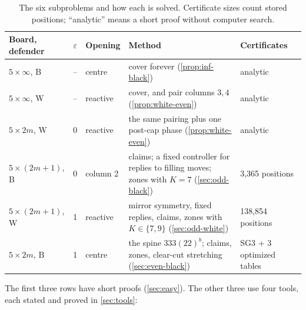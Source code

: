\documentclass[11pt,a4paper]{article}
\theoremstyle{plain}
\theoremstyle{definition}
\newcommand{\B}{\mathrm{B}}
\newcommand{\W}{\mathrm{W}}
\newcommand{\eps}{\varepsilon}
\begin{document}
\begin{table}[!htbp]
\centering
\caption{The six subproblems and how each is solved. Certificate sizes count stored positions; ``analytic'' means a short proof without computer search.}
\label{tab:overview}
\footnotesize
\begin{tabularx}{\linewidth}{@{}l c l Y l@{}}
\toprule
\textbf{Board, defender} & $\eps$ & \textbf{Opening} & \textbf{Method} & \textbf{Certificates} \\
\midrule
$5\times\infty$, $\B$ & -- & centre & cover forever (\cref{prop:inf-black}) & analytic \\
$5\times\infty$, $\W$ & -- & reactive & cover, and pair columns $3,4$ (\cref{prop:white-even}) & analytic \\
\midrule
$5\times 2m$, $\W$ & 0 & reactive & the same pairing plus one post-cap phase (\cref{prop:white-even}) & analytic \\
$5\times(2m{+}1)$, $\B$ & 0 & column 2 & claims; a fixed controller for replies to filling moves; zones with $K=7$ (\cref{sec:odd-black}) & 3{,}365 positions \\
\midrule
$5\times(2m{+}1)$, $\W$ & 1 & reactive & mirror symmetry, fixed replies, claims, zones with $K\in\{7,9\}$ (\cref{sec:odd-white}) & 138{,}854 positions \\
$5\times 2m$, $\B$ & 1 & centre & the spine $333(22)^b$; claims, zones, clear-cut stretching (\cref{sec:even-black}) & SG3 + 3 optimized tables \\
\bottomrule
\end{tabularx}
\end{table}

The first three rows have short proofs (\cref{sec:easy}). The other three use four tools, each stated and proved in \cref{sec:tools}:
\end{document}
